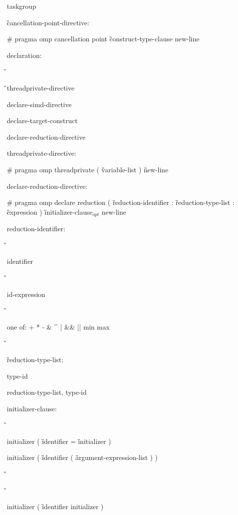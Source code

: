 {\I taskgroup

\G cancellation-point-directive:

\C\I \# pragma omp cancellation point \G construct-type-clause new-line

declaration:

\G{}

\G\I threadprivate-directive

\I declare-simd-directive

\I declare-target-construct

\I declare-reduction-directive

threadprivate-directive:

\C\I \# pragma omp threadprivate ( \G variable-list \C ) \G new-line

declare-reduction-directive:

\C\I \# pragma omp declare reduction ( \G reduction-identifier \C : \G reduction-type-list \C : \G expression \C ) \G initializer-clause$_{opt}$ new-line

reduction-identifier: 

\G\cspecificstart

\I identifier 

\G\cspecificend

\cppspecificstart

\I id-expression 

\G\cppspecificend

\ccppspecificstart

\I one of: \C + * - \& \^ { } \C | \&\& || min max 

\G\ccppspecificend

\G reduction-type-list: 

\I type-id 

\I reduction-type-list, type-id 

\begin{samepage}
initializer-clause: 

\G\cspecificstart

\C\I initializer ( \G identifier \C = \G initializer \C )

\C\I initializer ( \G identifier \C ( \G argument-expression-list \C ) ) 

\G\cspecificend
\end{samepage}

\G\cppspecificstart

\C\I initializer \C ( \G identifier initializer \C )

}
